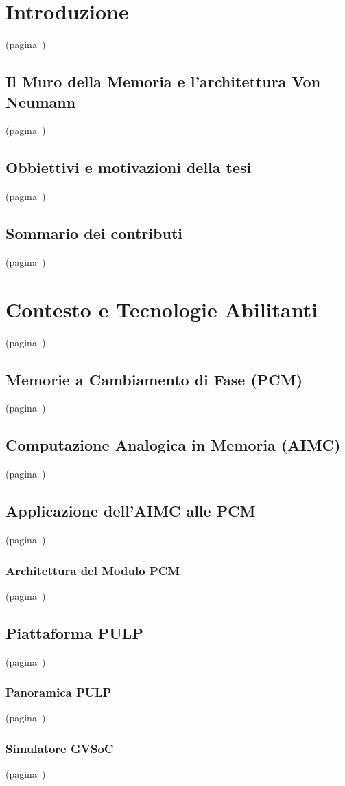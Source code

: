 \chapter{Introduzione} (pagina~\pageref{chap:intro})
\section{Il Muro della Memoria e l'architettura Von Neumann}(pagina~\pageref{sec:memwall})
\section{Obbiettivi e motivazioni della tesi}(pagina~\pageref{sec:obj})
\section{Sommario dei contributi}(pagina~\pageref{sec:contri})


\chapter{Contesto e Tecnologie Abilitanti} (pagina~\pageref{chap:background})
\section{Memorie a Cambiamento di Fase (PCM)}(pagina~\pageref{sec:pcm})
\section{Computazione Analogica in Memoria (AIMC)}(pagina~\pageref{sec:aimc})
\section{Applicazione dell'AIMC alle PCM}(pagina~\pageref{sec:aimc_pcm})
\subsection{Architettura del Modulo PCM}(pagina~\pageref{sec:PCM_Module_arch})
\section{Piattaforma PULP }(pagina~\pageref{sec:pulp})
\subsection{Panoramica PULP}(pagina~\pageref{sec:pulp_ov})
\subsection{Simulatore GVSoC}(pagina~\pageref{sec:gvsoc})


